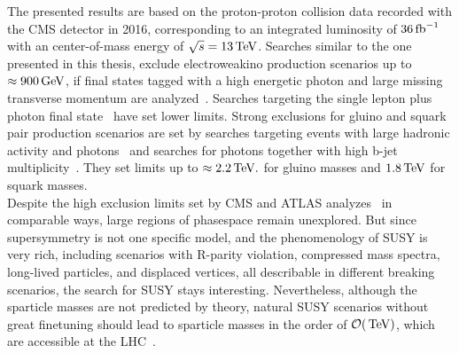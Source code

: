 The presented results are based on the proton-proton collision data recorded with the CMS detector in 2016, corresponding to an integrated luminosity of $36\mbox{\ensuremath{\,\text{fb}^\text{$-$1}}}$ with an center-of-mass energy of $\sqrt{s}=13\,\text{Te\hspace{-.08em}V}$. Searches similar to the one presented in this thesis, exclude electroweakino production scenarios up to $\approx900\,\text{Ge\hspace{-.08em}V}$, if final states tagged with a high energetic photon and large missing transverse momentum are analyzed~\cite{PhotonMet}. Searches targeting the single lepton plus photon final state~\cite{PhotonLepton} have set lower limits. Strong exclusions for gluino and squark pair production scenarios are set by searches targeting events with large hadronic activity and photons~\cite{PhotonHT} and searches for photons together with high b-jet multiplicity~\cite{PhotonBJet}. They set limits up to $\approx2.2\,\text{Te\hspace{-.08em}V}.$ for gluino masses and $1.8\,\text{Te\hspace{-.08em}V}$ for squark masses.\\
Despite the high exclusion limits set by CMS and ATLAS analyzes~\cite{AtlasGMSB1,AtlasGMSB2,AtlasGMSB3} in comparable ways, large regions of phasespace remain unexplored. But since supersymmetry is not one specific model, and the phenomenology of SUSY is very rich, including scenarios with R-parity violation, compressed mass spectra, long-lived particles, and displaced vertices, all describable in different breaking scenarios, the search for SUSY stays interesting. Nevertheless, although the sparticle masses are not predicted by theory, natural SUSY scenarios without great finetuning should lead to sparticle masses in the order of $\mathcal{O}(\,\text{Te\hspace{-.08em}V})$, which are accessible at the LHC~\cite{SUSYNaturalStatus}.

